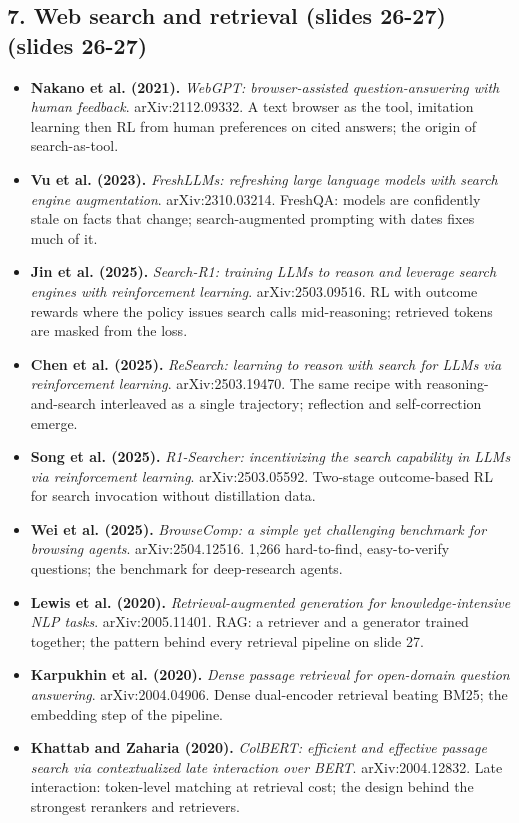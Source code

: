 \documentclass[11pt,letterpaper]{article}
\begin{document}
\subsection*{7. Web search and retrieval (slides 26-27) (slides 26-27)}
\begin{itemize}[leftmargin=1.2em,itemsep=3pt]\sloppy
\item \textbf{Nakano et al. (2021).} \textit{WebGPT: browser-assisted question-answering with human feedback}. arXiv:2112.09332. A text browser as the tool, imitation learning then RL from human preferences on cited answers; the origin of search-as-tool.
\item \textbf{Vu et al. (2023).} \textit{FreshLLMs: refreshing large language models with search engine augmentation}. arXiv:2310.03214. FreshQA: models are confidently stale on facts that change; search-augmented prompting with dates fixes much of it.
\item \textbf{Jin et al. (2025).} \textit{Search-R1: training LLMs to reason and leverage search engines with reinforcement learning}. arXiv:2503.09516. RL with outcome rewards where the policy issues search calls mid-reasoning; retrieved tokens are masked from the loss.
\item \textbf{Chen et al. (2025).} \textit{ReSearch: learning to reason with search for LLMs via reinforcement learning}. arXiv:2503.19470. The same recipe with reasoning-and-search interleaved as a single trajectory; reflection and self-correction emerge.
\item \textbf{Song et al. (2025).} \textit{R1-Searcher: incentivizing the search capability in LLMs via reinforcement learning}. arXiv:2503.05592. Two-stage outcome-based RL for search invocation without distillation data.
\item \textbf{Wei et al. (2025).} \textit{BrowseComp: a simple yet challenging benchmark for browsing agents}. arXiv:2504.12516. 1,266 hard-to-find, easy-to-verify questions; the benchmark for deep-research agents.
\item \textbf{Lewis et al. (2020).} \textit{Retrieval-augmented generation for knowledge-intensive NLP tasks}. arXiv:2005.11401. RAG: a retriever and a generator trained together; the pattern behind every retrieval pipeline on slide 27.
\item \textbf{Karpukhin et al. (2020).} \textit{Dense passage retrieval for open-domain question answering}. arXiv:2004.04906. Dense dual-encoder retrieval beating BM25; the embedding step of the pipeline.
\item \textbf{Khattab and Zaharia (2020).} \textit{ColBERT: efficient and effective passage search via contextualized late interaction over BERT}. arXiv:2004.12832. Late interaction: token-level matching at retrieval cost; the design behind the strongest rerankers and retrievers.

\end{itemize}
\end{document}
